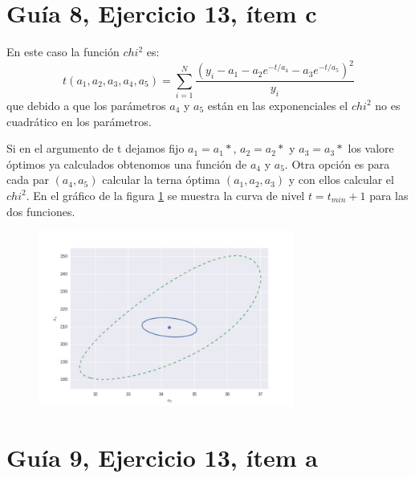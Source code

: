 \section*{Guía 8, Ejercicio 13, ítem c}
En este caso la función $chi^2$ es:
$$
t(a_1, a_2, a_3, a_4, a_5) = \sum_{i=1}^N \frac{\left(y_i-a_1 - a_2 e^{-t/a_4} - a_3 e^{-t/a_5}\right)^2}{y_i}
$$
que debido a que los parámetros $a_4$ y $a_5$ están en las exponenciales el $chi^2$ no es cuadrático en los parámetros.

Si en el argumento de t dejamos fijo $a_1=a_1*$, $a_2=a_2*$ y $a_3=a_3*$ los valore óptimos ya calculados obtenomos una función de $a_4$ y $a_5$.
 Otra opción es para cada par $(a_4, a_5)$ calcular la terna óptima $(a_1, a_2, a_3)$ y con ellos calcular el $chi^2$.
 En el gráfico de la figura \ref{fig:fig1} se muestra la curva de nivel $t=t_{min} + 1$ para las dos funciones.

\begin{figure}
\centering
\includegraphics[width=0.75\textwidth]{fig1.jpg}
\caption[]{}
\label{fig:fig1}
\end{figure}


\section*{Guía 9, Ejercicio 13, ítem a}
